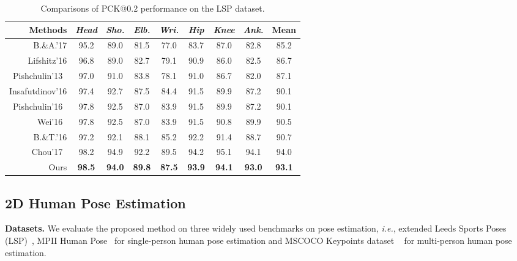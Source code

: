 \documentclass[10pt,journal,compsoc]{IEEEtran}
\begin{document}
\begin{table}[t!]
	\caption{Comparisons of PCK@0.2 performance on the LSP dataset.}
        \label{tab:Comparisons-of-PCK}
	\small
	\centering
	\setlength{\tabcolsep}{3.0pt}
	\scalebox{0.875}
	{
	\begin{tabular}{ r ||c|c|c|c|c|c|c||c  }
		\hline
			{Methods} & \emph{Head} & \emph{Sho.} & \emph{Elb.} & \emph{Wri.} & \emph{Hip} & \emph{Knee} & \emph{Ank.} & \textbf{Mean} \\
		\hline
		\hline
		B.\&A.'17 \cite{Belagiannis2016} & 95.2   & 89.0    & 81.5  &  77.0  &  83.7   &  87.0   & 82.8  &  85.2  \\
		Lifshitz'16 \cite{conf/eccv/LifshitzFU16}  & 96.8  &  89.0  &  82.7  &  79.1  &  90.9  &  86.0   & 82.5   & 86.7  \\
		Pishchulin'13~\cite{conf/iccv/PishchulinAGS13}   & 97.0    & 91.0   & 83.8   & 78.1   & 91.0  &  86.7  &  82.0   & 87.1  \\
		Insafutdinov'16 \cite{conf/eccv/InsafutdinovPAA16}   & 97.4   & 92.7   & 87.5  &  84.4  &  91.5  &  89.9   & 87.2  &  90.1  \\
		Pishchulin'16~\cite{conf/cvpr/PishchulinITAAG16}   & 97.8   & 92.5   & 87.0   & 83.9  &  91.5   & 89.9  &  87.2  &  90.1  \\
		Wei'16~\cite{conf/cvpr/WeiRKS16}   & 97.8   & 92.5  &  87.0  &  83.9  &  91.5   & 90.8   & 89.9   & 90.5  \\
		B.\&T.'16 \cite{conf/eccv/BulatT16}   & 97.2   & 92.1   & 88.1   & 85.2   & 92.2   & 91.4  &  88.7   & 90.7  \\
			Chou'17~{\cite{chou2017self}\footnotemark[1]}  & {{98.2}}& {94.9}& {92.2}& {89.5}& {94.2}& {95.1}&
				{94.1}&{94.0}\\
		\hline
		\hline
		Ours & \textbf{98.5}& \textbf{94.0}& \textbf{89.8}& \textbf{87.5}& \textbf{93.9}& \textbf{94.1}& \textbf{93.0}&\textbf{93.1}\\
		\hline
	\end{tabular}
%
	}
%
	\vspace{1em}
\leftline{
\footnotemark[1]{\footnotesize{\textcolor{black}{Published after the submission of our conference version.}}}}
\end{table}





\subsection{2D Human Pose Estimation}\label{subsec:exp_pose}
\noindent \textbf{Datasets.} We evaluate the proposed method on three widely used benchmarks on pose estimation, \emph{i.e.}, extended Leeds Sports Poses (LSP)~\cite{Johnson10}, MPII Human Pose~\cite{conf/cvpr/AndrilukaPGS14} for single-person human pose estimation and MSCOCO  Keypoints dataset ~\cite{lin2014microsoft} for multi-person human pose estimation.
\end{document}

